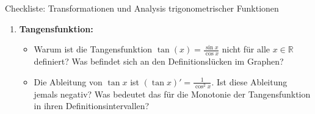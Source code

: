 \begin{aufgabenumgebung}{Checkliste: Transformationen und Analysis trigonometrischer Funktionen}
\begin{enumerate}[label=(\alph*)]
\begin{itemize}
    \end{itemize}
    \item \textbf{Tangensfunktion:}
    \begin{itemize}
        \item Warum ist die Tangensfunktion $\tan(x) = \frac{\sin x}{\cos x}$ nicht für alle $x \in \mathbb{R}$ definiert? Was befindet sich an den Definitionslücken im Graphen?
        \item Die Ableitung von $\tan x$ ist $(\tan x)' = \frac{1}{\cos^2 x}$. Ist diese Ableitung jemals negativ? Was bedeutet das für die Monotonie der Tangensfunktion in ihren Definitionsintervallen?
    \end{itemize}
\end{enumerate}
\end{aufgabenumgebung}


